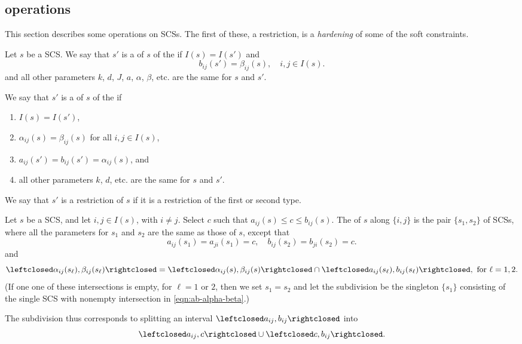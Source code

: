 






\subsection{operations}

This section describes some operations on SCSs.  
The first of these, a restriction,
 is a {\it hardening} of some of the soft constraints.


\begin{definition}[restriction]
Let $s$ be a SCS.
We say that $s'$ is a  of $s$ of the  if $I(s)=I(s')$ and
\[
b_{ij}(s') =  \beta_{ij}(s), \quad i,j\in I(s).
\]
and all other parameters $k$, $d$, $J$, $a$, $\alpha$, $\beta$, etc. are
the same for $s$ and $s'$.

We say that $s'$ is a  of $s$ of the  if 
\begin{enumerate}
\item $I(s)=I(s')$,
\item $\alpha_{ij}(s)=\beta_{ij}(s)$ for all $i,j\in I(s)$,
\item
$a_{ij}(s') = b_{ij}(s') = \alpha_{i j} (s)$,
and 
\item all other parameters $k$, $d$, etc.
are
the same for $s$ and $s'$.
\end{enumerate}
We say that $s'$ is a restriction of $s$ if it is a restriction of
the first or second type.
\end{definition}


\begin{definition}[subdivision] 
Let $s$ be a SCS,
and let $i,j\in  I(s)$, with $i\ne j$.  Select $c$ such that $a_{ij}(s)\le c\le b_{ij}(s)$.
The  of $s$ along $\{i,j\}$ is the pair $\{s_1,s_2\}$ 
of SCSs, where all the parameters for $s_1$ and $s_2$
are the same as those of $s$, except that
\[
a_{ij}(s_1)=a_{ji}(s_1) = c,  \quad  b_{ij}(s_2) = b_{ji}(s_2)=c.
\]
and
\begin{equation}\label{eqn:ab-alpha-beta}
\leftclosed\alpha_{ij}(s_\ell),\beta_{ij}(s_\ell)\rightclosed =
\leftclosed\alpha_{ij}(s),\beta_{ij}(s)\rightclosed\cap
\leftclosed a_{ij}(s_\ell),b_{ij}(s_\ell)\rightclosed, \text{ for } \ell=1,2.
\end{equation}
(If one one of these intersections is empty, for $\ell=1$ or $2$,  then we set $s_1=s_2$ and
let the subdivision be the singleton $\{s_1\}$ consisting of the single SCS  with nonempty intersection
in \eqref{eqn:ab-alpha-beta}.)
\end{definition}
The subdivision thus corresponds to splitting an interval 
$\leftclosed a_{ij},b_{ij}\rightclosed$ into
\[
\leftclosed a_{ij},c\rightclosed \cup \leftclosed c,b_{ij}\rightclosed.
\]



